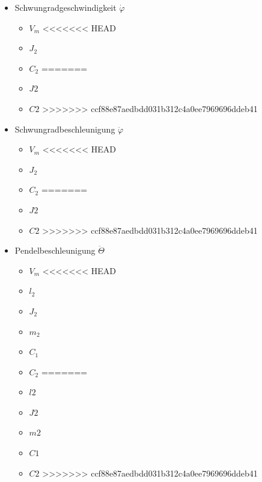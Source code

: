 \begin{minipage}[t]{.5\textwidth}
    \begin{itemize}
        \item Schwungradgeschwindigkeit $\dot\varphi$
        \begin{itemize}
            \item $V_m$
<<<<<<< HEAD
            \item $J_2$
            \item $C_2$
=======
            \item $J2$
            \item $C2$
>>>>>>> ccf88e87aedbdd031b312c4a0ee7969696ddeb41
        \end{itemize}
        \item Schwungradbeschleunigung $\ddot\varphi$
        \begin{itemize}
            \item $V_m$
<<<<<<< HEAD
            \item $J_2$
            \item $C_2$
=======
            \item $J2$
            \item $C2$
>>>>>>> ccf88e87aedbdd031b312c4a0ee7969696ddeb41
        \end{itemize}
        \item Pendelbeschleunigung $\ddot\Theta$
        \begin{itemize}
            \item $V_m$
<<<<<<< HEAD
            \item $l_2$
            \item $J_2$
            \item $m_2$
            \item $C_1$
            \item $C_2$
=======
            \item $l2$
            \item $J2$
            \item $m2$
            \item $C1$
            \item $C2$
>>>>>>> ccf88e87aedbdd031b312c4a0ee7969696ddeb41
        \end{itemize}
        \end{itemize}
\end{minipage}
